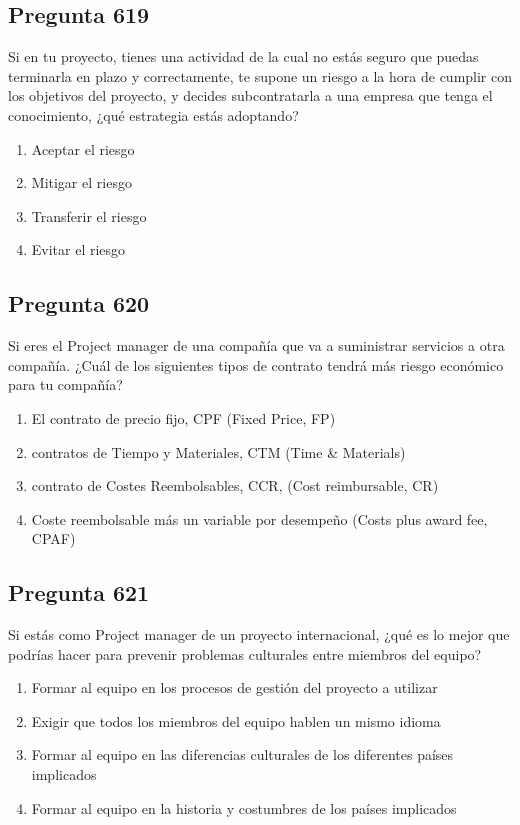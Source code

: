 \documentclass[11pt,a4paper]{article}
\begin{document}
\subsection*{Pregunta 619}
Si en tu proyecto, tienes una actividad de la cual no estás seguro que puedas terminarla en plazo y correctamente, te supone un riesgo a la hora de cumplir con los objetivos del proyecto, y decides subcontratarla a una empresa que tenga el conocimiento, ¿qué estrategia estás adoptando?

\begin{enumerate}[label=\alph*)]
  \item Aceptar el riesgo
  \item Mitigar el riesgo
  \item Transferir el riesgo
  \item Evitar el riesgo
\end{enumerate}

\subsection*{Pregunta 620}
Si eres el Project manager de una compañía que va a suministrar servicios a otra compañía. ¿Cuál de los siguientes tipos de contrato tendrá más riesgo económico para tu compañía?

\begin{enumerate}[label=\alph*)]
  \item El contrato de precio fijo, CPF (Fixed Price, FP)
  \item contratos de Tiempo y Materiales, CTM (Time \& Materials)
  \item contrato de Costes Reembolsables, CCR, (Cost reimbursable, CR)
  \item Coste reembolsable más un variable por desempeño (Costs plus award fee, CPAF)
\end{enumerate}

\subsection*{Pregunta 621}
Si estás como Project manager de un proyecto internacional, ¿qué es lo mejor que podrías hacer para prevenir problemas culturales entre miembros del equipo?

\begin{enumerate}[label=\alph*)]
  \item Formar al equipo en los procesos de gestión del proyecto a utilizar
  \item Exigir que todos los miembros del equipo hablen un mismo idioma
  \item Formar al equipo en las diferencias culturales de los diferentes países implicados
  \item Formar al equipo en la historia y costumbres de los países implicados
\end{enumerate}
\end{document}
